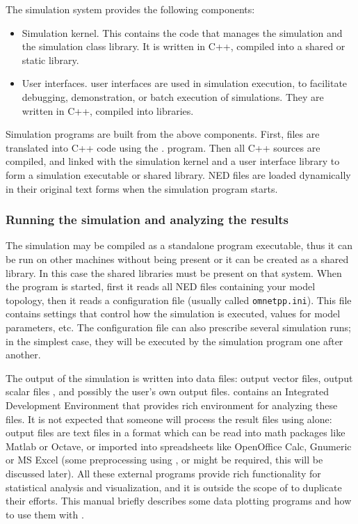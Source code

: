 The simulation system provides the following components:
\begin{itemize}
  \item{Simulation kernel. This contains the
    code that manages the simulation and the simulation class library.
    It is written in C++, compiled into a shared or static library.}
  \item{User interfaces.
     {\opp} user interfaces
    are used in simulation execution, to facilitate debugging,
    demonstration, or batch execution of simulations. They are
    written in C++, compiled into libraries.}
\end{itemize}


Simulation programs are built from the above components. First,
 files are translated into C++ code using the .
program. Then all C++ sources are compiled, and linked with the simulation
kernel and a user interface library to form a simulation executable or
shared library. NED files are loaded dynamically in their original
text forms when the simulation program starts.



\subsubsection{Running the simulation and analyzing the results}

The simulation may be compiled as a standalone program executable,
thus it can be run on other machines without {\opp}
being present or it can be created as a shared library. In this case the
{\opp} shared libraries must be present on that system.
When the program is started, first it reads all NED files
containing your model topology, then it reads a configuration
file (usually called
\texttt{omnetpp.ini}). This file contains settings that
control how the simulation is executed, values for model parameters, etc.
The configuration file can also prescribe several simulation runs; in
the simplest case, they will be executed by the simulation program one
after another.

The output of the simulation is written into data files: output vector
files, output scalar files
, and possibly the user's own output files.
{\opp} contains an Integrated Development Environment that provides
rich environment for analyzing these files. It is not expected that someone will
process the result files using {\opp} alone: output files are text
files in a format which can be read into math packages like Matlab
or Octave, or imported into spreadsheets like OpenOffice Calc,
Gnumeric or MS Excel (some preprocessing using , 
or  might be required, this will be discussed later).
All these external programs provide rich functionality for statistical
analysis and visualization, and it is outside the scope of {\opp} to
duplicate their efforts. This manual briefly describes
some data plotting programs and how to use them with {\opp}.

